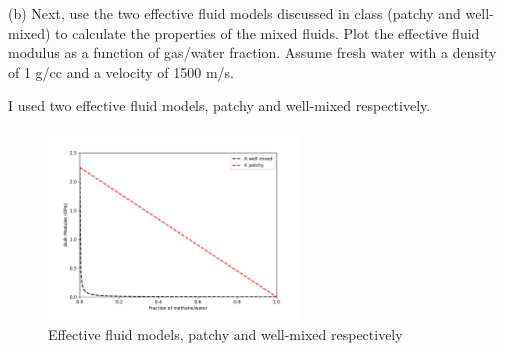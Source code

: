 \begin{problem}{(b)}
    Next, use the two effective fluid models discussed in class (patchy and well-mixed) to calculate the properties of the mixed fluids. Plot the effective fluid modulus as a function of gas/water fraction. Assume fresh water with a density of 1 g/cc and a velocity of 1500 m/s.
\end{problem}
\begin{solution}
    I used two effective fluid models, patchy and well-mixed respectively.
    \begin{figure}[H]
        \centering
        \includegraphics[width=0.6\textwidth]{figures/homework-2/p1-2-b.pdf}
        \caption{Effective fluid models, patchy and well-mixed respectively}
        \label{fig:p1-2-b}
    \end{figure}
\end{solution}



